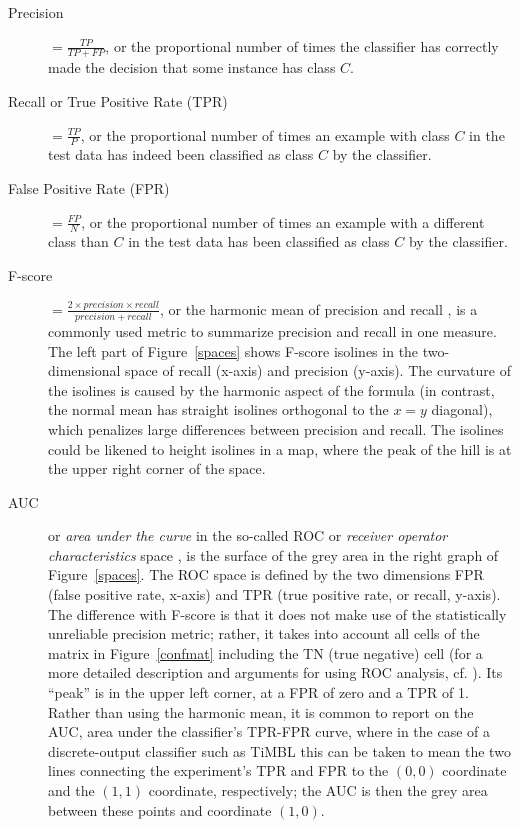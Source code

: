 \documentclass{report}
\begin{document}
\begin{description}
\item[Precision] $= \frac{TP}{TP+FP}$, or the
  proportional number of times the classifier has correctly made the
  decision that some instance has class $C$. 

\item[Recall or True Positive Rate
  (TPR)] $=
  \frac{TP}{P}$, or the proportional number of times an example with
  class $C$ in the test data has indeed been classified as class $C$
  by the classifier. 

\item[False Positive Rate (FPR)] $=
  \frac{FP}{N}$, or the proportional number of times an example with a
  different class than $C$ in the test data has been classified as
  class $C$ by the classifier.

\item[F-score] $= \frac{2 \times precision \times
  recall}{precision + recall}$, or the harmonic mean of precision and recall \cite{VanRijsbergen79}, is a commonly
  used metric to summarize precision and recall in one measure. The
  left part of Figure~\ref{spaces} shows F-score isolines in the
  two-dimensional space of recall (x-axis) and precision (y-axis). The
  curvature of the isolines is caused by the harmonic aspect of the
  formula (in contrast, the normal mean has straight isolines
  orthogonal to the $x=y$ diagonal), which penalizes large differences
  between precision and recall. The isolines could be likened to
  height isolines in a map, where the peak of the hill is at the upper
  right corner of the space.

\item [AUC] or {\em area under
  the curve}\/ in the so-called ROC or {\em receiver
  operator characteristics}\/
  space \cite{Egan75,Swets+00}, is the surface of the grey area in the
  right graph of Figure~\ref{spaces}. The ROC space is defined by the
  two dimensions FPR (false positive rate, x-axis) and TPR (true
  positive rate, or recall, y-axis). The difference with F-score is
  that it does not make use of the statistically unreliable precision
  metric; rather, it takes into account all cells of the matrix in
  Figure~\ref{confmat} including the TN (true negative) cell (for a
  more detailed description and arguments for using ROC analysis,
  cf. \cite{Fawcett04}). Its ``peak'' is in the upper left corner,
  at a FPR of zero and a TPR of 1. Rather than using the harmonic
  mean, it is common to report on the AUC, area under the classifier's
  TPR-FPR curve, where in the case of a discrete-output classifier
  such as {\sc TiMBL} this can be taken to mean the two lines
  connecting the experiment's TPR and FPR to the $(0,0)$ coordinate
  and the $(1,1)$ coordinate, respectively; the AUC is then the grey
  area between these points and coordinate $(1,0)$.

\end{description}
\end{document}
